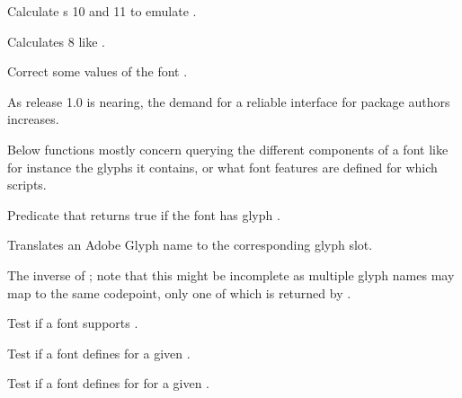    Calculate s 10 and 11 to emulate \XETEX.
  \endaltitem

    Calculates  8 like \XETEX.
  \endaltitem

    Correct some values of the font .
  \endaltitem

\endfunctionlist

\endsubsection


As \LUATEX release 1.0 is nearing, the demand for a reliable interface
for package authors increases.

\endsubsubsection


Below functions mostly concern querying the different components of a
font like for instance the glyphs it contains, or what font features
are defined for which scripts.

\beginfunctionlist

            Predicate that returns true if the font 
            has glyph .
  \endaltitem

            Translates an Adobe Glyph name to the corresponding glyph
            slot.
  \endaltitem

            The inverse of ; note that this
            might be incomplete as multiple glyph names may map to the
            same codepoint, only one of which is returned by
            .
  \endaltitem

            Test if a font supports .
  \endaltitem

            Test if a font defines  for a given
            .
  \endaltitem

            Test if a font defines  for
             for a given .
  \endaltitem

